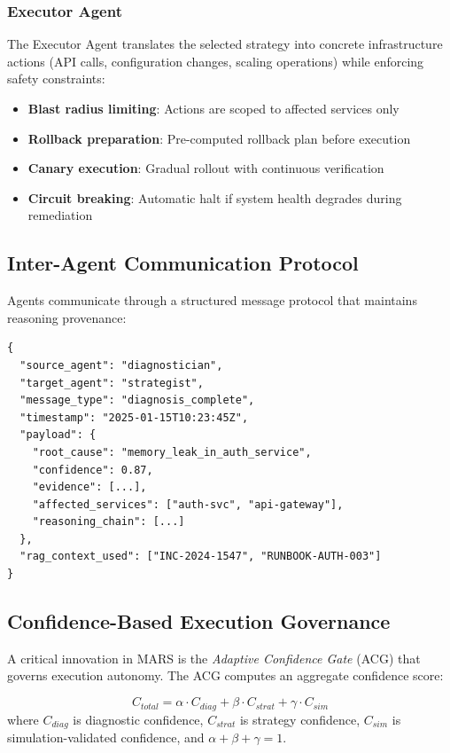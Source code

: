 \documentclass[journal]{IEEEtran}
\begin{document}
\subsubsection{Executor Agent}
The Executor Agent translates the selected strategy into concrete infrastructure actions (API calls, configuration changes, scaling operations) while enforcing safety constraints:

\begin{itemize}
    \item \textbf{Blast radius limiting}: Actions are scoped to affected services only
    \item \textbf{Rollback preparation}: Pre-computed rollback plan before execution
    \item \textbf{Canary execution}: Gradual rollout with continuous verification
    \item \textbf{Circuit breaking}: Automatic halt if system health degrades during remediation
\end{itemize}

\subsection{Inter-Agent Communication Protocol}

Agents communicate through a structured message protocol that maintains reasoning provenance:

\begin{lstlisting}[basicstyle=\tiny\ttfamily, frame=single, caption={Inter-Agent Message Schema}]
{
  "source_agent": "diagnostician",
  "target_agent": "strategist",
  "message_type": "diagnosis_complete",
  "timestamp": "2025-01-15T10:23:45Z",
  "payload": {
    "root_cause": "memory_leak_in_auth_service",
    "confidence": 0.87,
    "evidence": [...],
    "affected_services": ["auth-svc", "api-gateway"],
    "reasoning_chain": [...]
  },
  "rag_context_used": ["INC-2024-1547", "RUNBOOK-AUTH-003"]
}
\end{lstlisting}

\subsection{Confidence-Based Execution Governance}

A critical innovation in MARS is the \textit{Adaptive Confidence Gate} (ACG) that governs execution autonomy. The ACG computes an aggregate confidence score:

\begin{equation}
C_{total} = \alpha \cdot C_{diag} + \beta \cdot C_{strat} + \gamma \cdot C_{sim}
\label{eq:confidence}
\end{equation}
where $C_{diag}$ is diagnostic confidence, $C_{strat}$ is strategy confidence, $C_{sim}$ is simulation-validated confidence, and $\alpha + \beta + \gamma = 1$.
\end{document}
